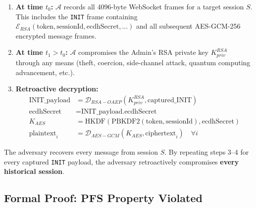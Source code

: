 \documentclass[12pt,a4paper]{article}
\begin{document}
\begin{enumerate}
    \item \textbf{At time $t_0$:} $\mathcal{A}$ records all 4096-byte WebSocket frames for a target session $S$. This includes the \texttt{INIT} frame containing $\mathcal{E}_{RSA}(\text{token}, \text{sessionId}, \text{ecdhSecret}, ...)$ and all subsequent AES-GCM-256 encrypted message frames.

    \item \textbf{At time $t_1 > t_0$:} $\mathcal{A}$ compromises the Admin's RSA private key $K_{priv}^{RSA}$ through any means (theft, coercion, side-channel attack, quantum computing advancement, etc.).

    \item \textbf{Retroactive decryption:}
    \begin{align}
        \text{INIT\_payload} &= \mathcal{D}_{RSA-OAEP}(K_{priv}^{RSA}, \text{captured\_INIT}) \\
        \text{ecdhSecret} &= \text{INIT\_payload.ecdhSecret} \\
        K_{AES} &= \text{HKDF}(\text{PBKDF2}(\text{token}, \text{sessionId}), \text{ecdhSecret}) \\
        \text{plaintext}_i &= \mathcal{D}_{AES-GCM}(K_{AES}, \text{ciphertext}_i) \quad \forall i
    \end{align}
\end{enumerate}

The adversary recovers every message from session $S$. By repeating steps 3--4 for every captured \texttt{INIT} payload, the adversary retroactively compromises \textbf{every historical session}.

\subsection{Formal Proof: PFS Property Violated}
\end{document}
